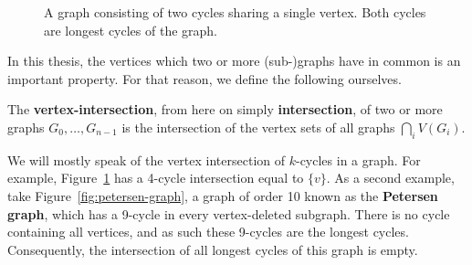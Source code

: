 \begin{figure}[ht]
    \centering
    \caption{A graph consisting of two cycles sharing a single vertex. Both cycles are longest cycles of the graph.}
    \label{fig:infinity-graph}
\end{figure}

In this thesis, the vertices which two or more (sub-)graphs have in common is an important property. For that reason, we define the following ourselves.

\begin{definition}[Intersection]
  The \textbf{vertex-intersection}, from here on simply \textbf{intersection}, of two or more graphs $G_0,\ldots,G_{n-1}$ is the intersection of the vertex sets of all graphs $\bigcap_{i} V(G_i)$.
\end{definition}

We will mostly speak of the vertex intersection of $k$-cycles in a graph. For example, Figure~\ref{fig:infinity-graph} has a 4-cycle intersection equal to $\{v\}$. As a second example, take Figure~\ref{fig:petersen-graph}, a graph of order 10 known as the \textbf{Petersen graph}, which has a 9-cycle in every vertex-deleted subgraph. There is no cycle containing all vertices, and as such these 9-cycles are the longest cycles. Consequently, the intersection of all  longest cycles of this graph is empty.

